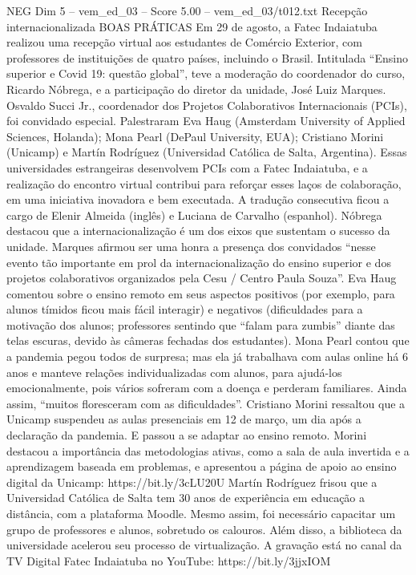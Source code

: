 \begin{textsample}{NEG Dim 5 – vem\_ed\_03 – Score 5.00 – vem\_ed\_03/t012.txt}  \label{ex:f5_neg_113}
Recepção internacionalizada BOAS PRÁTICAS Em 29 de agosto, a Fatec Indaiatuba realizou uma recepção virtual aos estudantes de Comércio Exterior, com professores de instituições de quatro países, incluindo o Brasil.
Intitulada “Ensino superior e Covid 19: questão global”, teve a moderação do coordenador do curso, Ricardo Nóbrega, e a participação do diretor da unidade, José Luiz Marques.
Osvaldo Succi Jr., coordenador dos Projetos Colaborativos Internacionais (PCIs), foi convidado especial.
Palestraram Eva Haug (Amsterdam University of Applied Sciences, Holanda); Mona Pearl (DePaul University, EUA); Cristiano Morini (Unicamp) e Martín Rodríguez (Universidad Católica de Salta, Argentina).
Essas universidades estrangeiras desenvolvem PCIs com a Fatec Indaiatuba, e a realização do encontro virtual contribui para reforçar esses laços de colaboração, em uma iniciativa inovadora e bem executada.
A tradução consecutiva ficou a cargo de Elenir Almeida (inglês) e Luciana de Carvalho (espanhol).
Nóbrega destacou que a internacionalização é um dos eixos que sustentam o sucesso da unidade.
Marques afirmou ser uma honra a presença dos convidados “nesse evento tão importante em prol da internacionalização do ensino superior e dos projetos colaborativos organizados pela Cesu / Centro Paula Souza”.
Eva Haug comentou sobre o ensino remoto em seus aspectos positivos (por exemplo, para alunos tímidos ficou mais fácil interagir) e negativos (dificuldades para a motivação dos alunos; professores sentindo que “falam para zumbis” diante das telas escuras, devido às câmeras fechadas dos estudantes).
Mona Pearl contou que a pandemia pegou todos de surpresa; mas ela já trabalhava com aulas online há 6 anos e manteve relações individualizadas com alunos, para ajudá-los emocionalmente, pois vários sofreram com a doença e perderam familiares.
Ainda assim, “muitos floresceram com as dificuldades”.
Cristiano Morini ressaltou que a Unicamp suspendeu as aulas presenciais em 12 de março, um dia após a declaração da pandemia.
E passou a se adaptar ao ensino remoto.
Morini destacou a importância das metodologias ativas, como a sala de aula invertida e a aprendizagem baseada em problemas, e apresentou a página de apoio ao ensino digital da Unicamp: https://bit.ly/3cLU20U Martín Rodríguez frisou que a Universidad Católica de Salta tem 30 anos de experiência em educação a distância, com a plataforma Moodle.
Mesmo assim, foi necessário capacitar um grupo de professores e alunos, sobretudo os calouros.
Além disso, a biblioteca da universidade acelerou seu processo de virtualização.
A gravação está no canal da TV Digital Fatec Indaiatuba no YouTube: https://bit.ly/3jjxIOM

\end{textsample}
